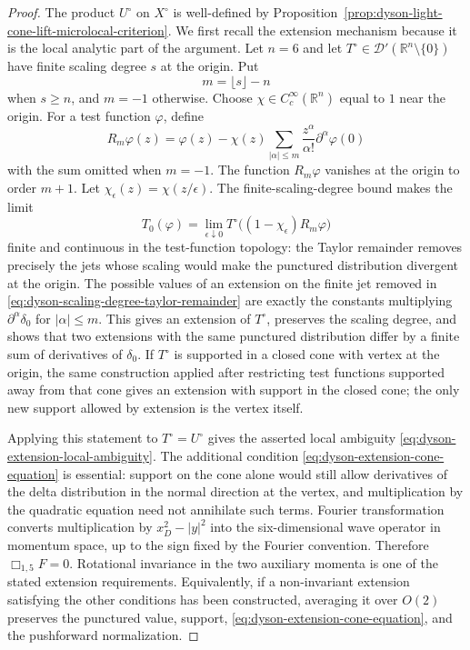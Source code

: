 \begin{proof}
The product \(U^\circ\) on \(X^\circ\) is well-defined by
Proposition~\ref{prop:dyson-light-cone-lift-microlocal-criterion}.  We first
recall the extension mechanism because it is the local analytic part of the
argument.  Let \(n=6\) and let \(T^\circ\in\mathcal D'(\mathbb R^n\setminus
\{0\})\) have finite scaling degree \(s\) at the origin.  Put
\[
  m=\lfloor s\rfloor-n
\]
when \(s\ge n\), and \(m=-1\) otherwise.  Choose
\(\chi\in C_c^\infty(\mathbb R^n)\) equal to \(1\) near the origin.  For a
test function \(\varphi\), define
\begin{equation}
  R_m\varphi(z)
  =
  \varphi(z)
  -
  \chi(z)
  \sum_{|\alpha|\le m}
  \frac{z^\alpha}{\alpha!}\partial^\alpha\varphi(0)
  \label{eq:dyson-scaling-degree-taylor-remainder}
\end{equation}
with the sum omitted when \(m=-1\).  The function \(R_m\varphi\) vanishes at
the origin to order \(m+1\).  Let \(\chi_\epsilon(z)=\chi(z/\epsilon)\).
The finite-scaling-degree bound makes the limit
\[
  T_0(\varphi)
  =
  \lim_{\epsilon\downarrow0}
  T^\circ\bigl((1-\chi_\epsilon)R_m\varphi\bigr)
\]
finite and continuous in the test-function topology: the Taylor remainder
removes precisely the jets whose scaling would make the punctured
distribution divergent at the origin.  The possible values of an extension on
the finite jet removed in
\eqref{eq:dyson-scaling-degree-taylor-remainder} are exactly the constants
multiplying \(\partial^\alpha\delta_0\) for \(|\alpha|\le m\).  This gives an
extension of \(T^\circ\), preserves the scaling degree, and shows that two
extensions with the same punctured distribution differ by a finite sum of
derivatives of \(\delta_0\).  If \(T^\circ\) is supported in a closed cone
with vertex at the origin, the same construction applied after restricting
test functions supported away from that cone gives an extension with support
in the closed cone; the only new support allowed by extension is the vertex
itself.

Applying this statement to \(T^\circ=U^\circ\) gives the asserted local
ambiguity \eqref{eq:dyson-extension-local-ambiguity}.  The additional
condition \eqref{eq:dyson-extension-cone-equation} is essential: support on
the cone alone would still allow derivatives of the delta distribution in
the normal direction at the vertex, and multiplication by the quadratic
equation need not annihilate such terms.  Fourier transformation converts
multiplication by \(x_D^2-|y|^2\) into the six-dimensional wave operator in
momentum space, up to the sign fixed by the Fourier convention.  Therefore
\(\Box_{1,5}F=0\).  Rotational invariance in the two auxiliary momenta is one
of the stated extension requirements.  Equivalently, if a non-invariant
extension satisfying the other conditions has been constructed, averaging it
over \(O(2)\) preserves the punctured value, support,
\eqref{eq:dyson-extension-cone-equation}, and the pushforward normalization.


\end{proof}
